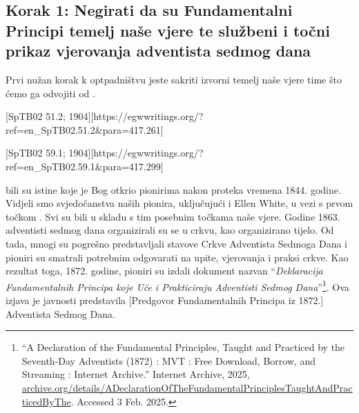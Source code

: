 \subsection*{Korak 1: Negirati da su Fundamentalni Principi temelj naše vjere te službeni i točni prikaz vjerovanja adventista sedmog dana}

Prvi nužan korak k optpadništvu jeste sakriti izvorni temelj naše vjere time što ćemo ga odvojiti od .

[SpTB02 51.2; 1904][https://egwwritings.org/?ref=en\_SpTB02.51.2&para=417.261]

[SpTB02 59.1; 1904][https://egwwritings.org/?ref=en\_SpTB02.59.1&para=417.299]

 bili su istine koje je Bog otkrio pionirima nakon proteka vremena 1844. godine. Vidjeli smo svjedočanstva naših pionira, uključujući i Ellen White, u vezi s prvom točkom . Svi su bili u skladu s tim posebnim točkama naše vjere. Godine 1863. adventisti sedmog dana organizirali su se u crkvu, kao organizirano tijelo. Od tada, mnogi su pogrešno predstavljali stavove Crkve Adventista Sedmoga Dana i pioniri su smatrali potrebnim odgovarati na upite,  vjerovanja i praksi crkve. Kao rezultat toga, 1872. godine, pioniri su izdali dokument nazvan “\textit{Deklaracija Fundamentalnih Principa koje Uče i Prakticiraju Adventisti Sedmog Dana}”\footnote{“A Declaration of the Fundamental Principles, Taught and Practiced by the Seventh-Day Adventists (1872) : MVT : Free Download, Borrow, and Streaming : Internet Archive.” Internet Archive, 2025, \href{https://archive.org/details/ADeclarationOfTheFundamentalPrinciplesTaughtAndPracticedByThe}{archive.org/details/ADeclarationOfTheFundamentalPrinciplesTaughtAndPracticedByThe}. Accessed 3 Feb. 2025.}. Ova izjava je javnosti predstavila [Predgovor Fundamentalnih Principa iz 1872.] Adventista Sedmog Dana.

